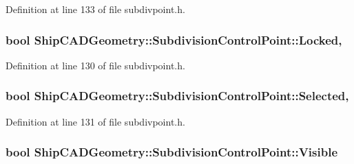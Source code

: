 Definition at line 133 of file subdivpoint.\-h.

\hypertarget{classShipCADGeometry_1_1SubdivisionControlPoint_a1e192709a33919e76207ebce39c4c916}{
\subsubsection[{Locked}]{\setlength{\rightskip}{0pt plus 5cm}bool Ship\-C\-A\-D\-Geometry\-::\-Subdivision\-Control\-Point\-::\-Locked\hspace{0.3cm}{\ttfamily [read]}, {\ttfamily [write]}}}\label{classShipCADGeometry_1_1SubdivisionControlPoint_a1e192709a33919e76207ebce39c4c916}


Definition at line 130 of file subdivpoint.\-h.

\hypertarget{classShipCADGeometry_1_1SubdivisionControlPoint_a8ae4af44e0ff44086685a9b3a362dd43}{
\subsubsection[{Selected}]{\setlength{\rightskip}{0pt plus 5cm}bool Ship\-C\-A\-D\-Geometry\-::\-Subdivision\-Control\-Point\-::\-Selected\hspace{0.3cm}{\ttfamily [read]}, {\ttfamily [write]}}}\label{classShipCADGeometry_1_1SubdivisionControlPoint_a8ae4af44e0ff44086685a9b3a362dd43}


Definition at line 131 of file subdivpoint.\-h.

\hypertarget{classShipCADGeometry_1_1SubdivisionControlPoint_a1170db5bc9091fb18f6dfb3fd61d4413}{
\subsubsection[{Visible}]{\setlength{\rightskip}{0pt plus 5cm}bool Ship\-C\-A\-D\-Geometry\-::\-Subdivision\-Control\-Point\-::\-Visible\hspace{0.3cm}{\ttfamily [read]}}}\label{classShipCADGeometry_1_1SubdivisionControlPoint_a1170db5bc9091fb18f6dfb3fd61d4413}


